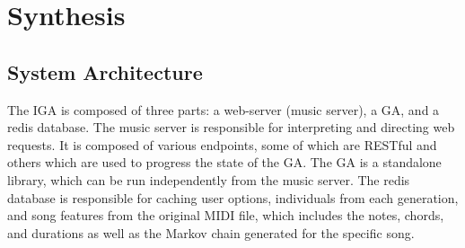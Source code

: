 \documentclass[12pt]{article} %
\begin{document}



\section{Synthesis}
\subsection{System Architecture}


The IGA is composed of three parts: a web-server (music server), a GA, and a redis database. The music server is responsible for interpreting and directing web requests. It is composed of various endpoints, some of which are RESTful and others which are used to progress the state of the GA. The GA is a standalone library, which can be run independently from the music server.  The redis database is responsible for caching user options, individuals from each generation, and song features from the original MIDI file, which includes the notes, chords, and durations as well as the Markov chain generated for the specific song. \\
\end{document}
